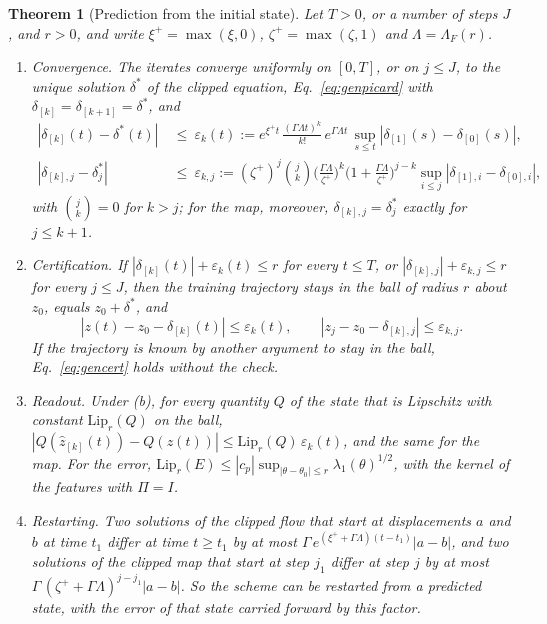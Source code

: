 \documentclass[11pt]{article}
\newtheorem{theorem}{Theorem}
\theoremstyle{definition}
\theoremstyle{remark}
\begin{document}
\begin{theorem}[Prediction from the initial state]\label{thm:predict}
Let $T > 0$, or a number of steps $J$, and $r > 0$, and write $\xi^+ = \max(\xi, 0)$, $\zeta^+ = \max(\zeta, 1)$ and $\Lambda = \Lambda_F(r)$.
\begin{enumerate}[label=(\alph*)]
\item \emph{Convergence.} The iterates converge uniformly on $[0,T]$, or on $j\le J$, to the unique solution $\delta^\ast$ of the clipped equation, Eq.~\eqref{eq:genpicard} with $\delta_{[k]} = \delta_{[k+1]} = \delta^\ast$, and
\begin{equation}\label{eq:genbound}
\begin{aligned}
|\delta_{[k]}(t) - \delta^\ast(t)|\ &\le\ \varepsilon_k(t) := e^{\xi^+t}\,\frac{(\Gamma\Lambda t)^k}{k!}\,e^{\Gamma\Lambda t}\,\sup_{s\le t}|\delta_{[1]}(s) - \delta_{[0]}(s)|,\\
|\delta_{[k],j} - \delta^\ast_j|\ &\le\ \varepsilon_{k,j} := (\zeta^+)^j\binom jk\Big(\frac{\Gamma\Lambda}{\zeta^+}\Big)^k\Big(1 + \frac{\Gamma\Lambda}{\zeta^+}\Big)^{j-k}\sup_{i\le j}|\delta_{[1],i} - \delta_{[0],i}|,
\end{aligned}
\end{equation}
with $\binom jk = 0$ for $k > j$; for the map, moreover, $\delta_{[k],j} = \delta^\ast_j$ exactly for $j\le k + 1$.
\item \emph{Certification.} If $|\delta_{[k]}(t)| + \varepsilon_k(t)\le r$ for every $t\le T$, or $|\delta_{[k],j}| + \varepsilon_{k,j}\le r$ for every $j\le J$, then the training trajectory stays in the ball of radius $r$ about $z_0$, equals $z_0 + \delta^\ast$, and
\begin{equation}\label{eq:gencert}
|z(t) - z_0 - \delta_{[k]}(t)|\le\varepsilon_k(t),\qquad |z_j - z_0 - \delta_{[k],j}|\le\varepsilon_{k,j}.
\end{equation}
If the trajectory is known by another argument to stay in the ball, Eq.~\eqref{eq:gencert} holds without the check.
\item \emph{Readout.} Under (b), for every quantity $Q$ of the state that is Lipschitz with constant $\mathrm{Lip}_r(Q)$ on the ball, $|Q(\hat z_{[k]}(t)) - Q(z(t))|\le\mathrm{Lip}_r(Q)\,\varepsilon_k(t)$, and the same for the map.
For the error, $\mathrm{Lip}_r(E)\le|c_p|\sup_{|\theta-\theta_0|\le r}\lambda_1(\theta)^{1/2}$, with the kernel of the features with $\Pi = I$.
\item \emph{Restarting.} Two solutions of the clipped flow that start at displacements $a$ and $b$ at time $t_1$ differ at time $t\ge t_1$ by at most $\Gamma\,e^{(\xi^+ + \Gamma\Lambda)(t - t_1)}|a - b|$, and two solutions of the clipped map that start at step $j_1$ differ at step $j$ by at most $\Gamma\,(\zeta^+ + \Gamma\Lambda)^{j - j_1}|a - b|$.
So the scheme can be restarted from a predicted state, with the error of that state carried forward by this factor.
\end{enumerate}
\end{theorem}
\end{document}
